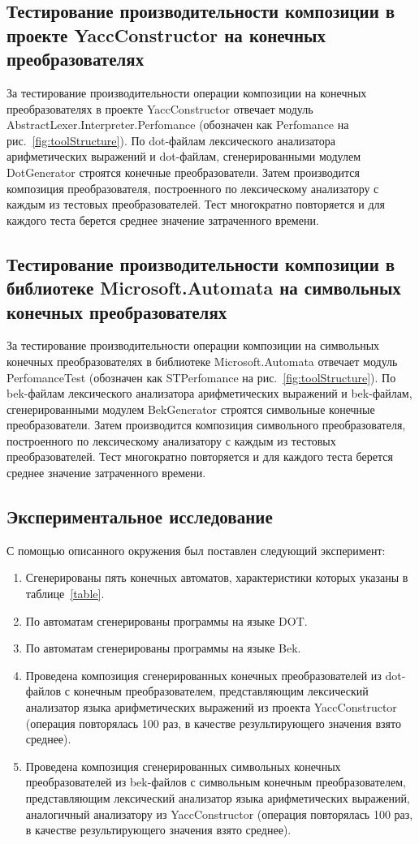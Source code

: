 \subsection{Тестирование производительности композиции в проекте YaccConstructor на конечных преобразователях}
За тестирование производительности операции композиции на конечных преобразователях в проекте YaccConstructor отвечает модуль AbstractLexer.Interpreter.Perfomance (обозначен как Perfomance на рис.~\ref{fig:toolStructure}). По dot-файлам лексического анализатора арифметических выражений и dot-файлам, сгенерированными модулем DotGenerator строятся конечные преобразователи. Затем производится композиция преобразователя, построенного по лексическому анализатору с каждым из тестовых преобразователей. Тест многократно повторяется и для каждого теста берется среднее значение затраченного времени.

\subsection{Тестирование производительности композиции в библиотеке Microsoft.Automata на символьных конечных преобразователях}
За тестирование производительности операции композиции на символьных конечных преобразователях в библиотеке Microsoft.Automata отвечает модуль PerfomanceTest (обозначен как STPerfomance на рис.~\ref{fig:toolStructure}). По bek-файлам лексического анализатора арифметических выражений и bek-файлам, сгенерированными модулем BekGenerator строятся символьные конечные преобразователи. Затем производится композиция символьного преобразователя, построенного по лексическому анализатору с каждым из тестовых преобразователей. Тест многократно повторяется и для каждого теста берется среднее значение затраченного времени.

\subsection{Экспериментальное исследование}
С помощью описанного окружения был поставлен следующий эксперимент:

\begin{enumerate}
\item Сгенерированы пять конечных автоматов, характеристики которых указаны в таблице~\ref{table}.
\item По автоматам сгенерированы программы на языке DOT.
\item По автоматам сгенерированы программы на языке Bek.
\item Проведена композиция сгенерированных конечных преобразователей из dot-файлов с конечным преобразователем, представляющим лексический анализатор языка арифметических выражений из проекта YaccConstructor (операция повторялась 100 раз, в качестве результирующего значения взято среднее).
\item Проведена композиция сгенерированных символьных конечных преобразователей из bek-файлов с символьным конечным преобразователем, представляющим лексический анализатор языка арифметических выражений, аналогичный анализатору из YaccConstructor (операция повторялась 100 раз, в качестве результирующего значения взято среднее).
\end{enumerate}


